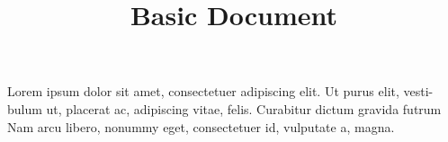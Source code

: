 \documentclass{article}
\begin{document}
\title{Basic Document}
\author{}
\date{}

\maketitle

Lorem ipsum dolor sit amet, consectetuer adipiscing elit. Ut purus elit, vesti-
bulum ut, placerat ac, adipiscing vitae, felis. Curabitur dictum gravida futrum
\hbox{} %
Nam arcu libero, nonummy eget, consectetuer id, vulputate a, magna.
\end{document}
